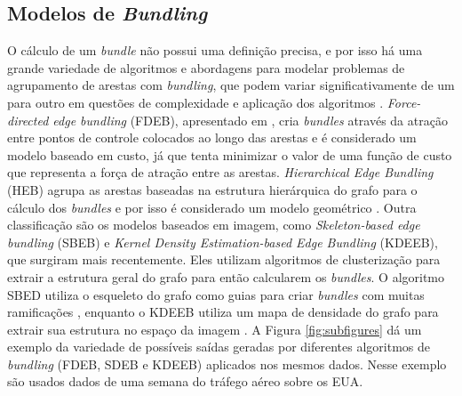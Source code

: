 \subsection{Modelos de \emph{Bundling}}
\label{sec:modelos-de-bundling}

  O cálculo de um \emph{bundle} não possui uma definição precisa, e por isso há
uma grande variedade de algoritmos e abordagens para modelar problemas de
agrupamento de arestas com \emph{bundling}, que podem variar significativamente
de um para outro em questões de complexidade e aplicação dos algoritmos
\citep{Zhou2013}.  \emph{Force-directed edge bundling} (FDEB), apresentado em
\citet{Holten2009}, cria \emph{bundles} através da atração entre pontos de
controle colocados ao longo das arestas e é considerado um modelo baseado em
custo, já que tenta minimizar o valor de uma função de custo que representa a
força de atração entre as arestas.  \emph{Hierarchical Edge Bundling} (HEB)
agrupa as arestas baseadas na estrutura hierárquica do grafo para o cálculo dos
\emph{bundles} e por isso é considerado um modelo geométrico \citep{Holten2006}. Outra
classificação são os modelos baseados em imagem, como \emph{Skeleton-based edge
bundling} (SBEB) e \emph{Kernel Density Estimation-based Edge Bundling}
(KDEEB), que surgiram mais recentemente. Eles utilizam algoritmos de
clusterização para extrair a estrutura geral do grafo para então calcularem os
\emph{bundles}. O algoritmo SBED utiliza o esqueleto do grafo como guias para
criar \emph{bundles} com muitas ramificações \citep{Ersoy2011}, enquanto o
KDEEB utiliza um mapa de densidade do grafo para extrair sua estrutura no
espaço da imagem \citep{Hurter2012}. A Figura \ref{fig:subfigures} dá um
exemplo da variedade de possíveis saídas geradas por diferentes algoritmos de
\emph{bundling} (FDEB, SDEB e KDEEB) aplicados nos mesmos dados.  Nesse exemplo
são usados dados de uma semana do tráfego aéreo sobre os EUA.

